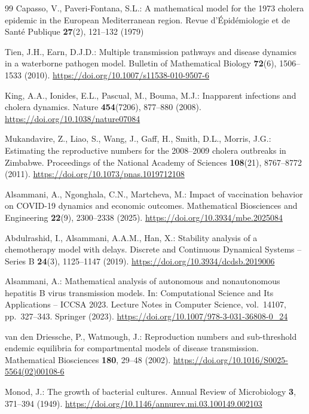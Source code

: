 \documentclass[11pt]{article}
\theoremstyle{plain}
\theoremstyle{definition}
\theoremstyle{remark}
\begin{document}
\begin{thebibliography}{99}
Capasso, V., Paveri-Fontana, S.L.: A mathematical model for the 1973 cholera epidemic in the European Mediterranean region. Revue d'\'Epid\'emiologie et de Sant\'e Publique \textbf{27}(2), 121--132 (1979)

Tien, J.H., Earn, D.J.D.: Multiple transmission pathways and disease dynamics in a waterborne pathogen model. Bulletin of Mathematical Biology \textbf{72}(6), 1506--1533 (2010). \url{https://doi.org/10.1007/s11538-010-9507-6}

King, A.A., Ionides, E.L., Pascual, M., Bouma, M.J.: Inapparent infections and cholera dynamics. Nature \textbf{454}(7206), 877--880 (2008). \url{https://doi.org/10.1038/nature07084}

Mukandavire, Z., Liao, S., Wang, J., Gaff, H., Smith, D.L., Morris, J.G.: Estimating the reproductive numbers for the 2008--2009 cholera outbreaks in Zimbabwe. Proceedings of the National Academy of Sciences \textbf{108}(21), 8767--8772 (2011). \url{https://doi.org/10.1073/pnas.1019712108}

Alsammani, A., Ngonghala, C.N., Martcheva, M.: Impact of vaccination behavior on COVID-19 dynamics and economic outcomes. Mathematical Biosciences and Engineering \textbf{22}(9), 2300--2338 (2025). \url{https://doi.org/10.3934/mbe.2025084}

Abdulrashid, I., Alsammani, A.A.M., Han, X.: Stability analysis of a chemotherapy model with delays. Discrete and Continuous Dynamical Systems -- Series B \textbf{24}(3), 1125--1147 (2019). \url{https://doi.org/10.3934/dcdsb.2019006}

Alsammani, A.: Mathematical analysis of autonomous and nonautonomous hepatitis B virus transmission models. In: Computational Science and Its Applications -- ICCSA 2023. Lecture Notes in Computer Science, vol.~14107, pp.~327--343. Springer (2023). \url{https://doi.org/10.1007/978-3-031-36808-0_24}

van den Driessche, P., Watmough, J.: Reproduction numbers and sub-threshold endemic equilibria for compartmental models of disease transmission. Mathematical Biosciences \textbf{180}, 29--48 (2002). \url{https://doi.org/10.1016/S0025-5564(02)00108-6}

Monod, J.: The growth of bacterial cultures. Annual Review of Microbiology \textbf{3}, 371--394 (1949). \url{https://doi.org/10.1146/annurev.mi.03.100149.002103}


\end{thebibliography}
\end{document}
